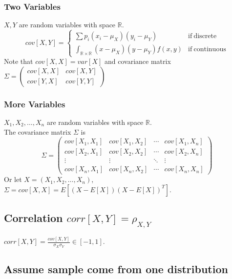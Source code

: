 \documentclass{article}
\begin{document}
            \subsubsection{Two Variables}
                $X,Y$ are random variables with space $\mathbb{R}$.
                \[
                cov[X,Y]=\left\{\begin{array}{ll}
                        \sum p_i(x_i-\mu_X)(y_i-\mu_Y)& \mathrm{if~discrete} \\[0.2cm]
                        \int_{\mathbb{R}\times\mathbb{R}}(x-\mu_X)(y-\mu_Y)f(x,y) & \mathrm{if~continuous}
                \end{array}\right.
                \]
                Note that $cov[X,X]=var[X]$ and covariance matrix
                $
                    \Sigma = \begin{pmatrix}
                        cov[X,X] & cov[X,Y]\\
                        cov[Y,X] & cov[Y,Y]
                    \end{pmatrix}
                $
            \subsubsection{More Variables}
                $X_1,X_2,\dots,X_n$ are random variables with space $\mathbb{R}$.\\
                The covariance matrix $\Sigma$ is
                \[
                    \Sigma = \begin{pmatrix}
                        cov[X_1,X_1] & cov[X_1,X_2] & \cdots & cov[X_1,X_n]\\
                        cov[X_2,X_1] & cov[X_2,X_2] & \cdots & cov[X_2,X_n]\\
                        \vdots & \vdots & \ddots & \vdots\\
                        cov[X_n,X_1] & cov[X_n,X_2] & \cdots & cov[X_n,X_n]
                    \end{pmatrix}
                \]
                Or let $X=(X_1,X_2,\dots,X_n)$, $\Sigma=cov[X,X]=E[(X-E[X])(X-E[X])^T]$.
                
        \subsection{Correlation \texorpdfstring{$corr[X,Y]=\rho_{X,Y}$}{}}
            $corr[X,Y]=\frac{cov[X,Y]}{\sigma_X \sigma_Y}\in[-1,1]$.
        \subsection{Assume sample come from one distribution}
\end{document}

